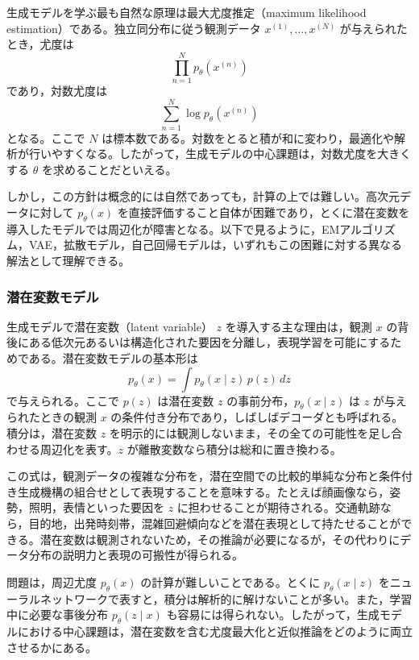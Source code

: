 生成モデルを学ぶ最も自然な原理は最大尤度推定（maximum likelihood estimation）である。独立同分布に従う観測データ \(x^{(1)},\dots,x^{(N)}\) が与えられたとき，尤度は
\begin{equation}
\prod_{n=1}^{N} p_{\theta}(x^{(n)})
\end{equation}
であり，対数尤度は
\begin{equation}
\sum_{n=1}^{N} \log p_{\theta}(x^{(n)})
\end{equation}
となる。ここで \(N\) は標本数である。対数をとると積が和に変わり，最適化や解析が行いやすくなる。したがって，生成モデルの中心課題は，対数尤度を大きくする \(\theta\) を求めることだといえる。

しかし，この方針は概念的には自然であっても，計算の上では難しい。高次元データに対して \(p_{\theta}(x)\) を直接評価すること自体が困難であり，とくに潜在変数を導入したモデルでは周辺化が障害となる。以下で見るように，EMアルゴリズム，VAE，拡散モデル，自己回帰モデルは，いずれもこの困難に対する異なる解法として理解できる。

\subsubsection{潜在変数モデル}

生成モデルで潜在変数（latent variable） \(z\) を導入する主な理由は，観測 \(x\) の背後にある低次元あるいは構造化された要因を分離し，表現学習を可能にするためである。潜在変数モデルの基本形は
\begin{equation}
p_{\theta}(x) = \int p_{\theta}(x \mid z)\, p(z)\, dz
\end{equation}
で与えられる。ここで \(p(z)\) は潜在変数 \(z\) の事前分布，\(p_{\theta}(x \mid z)\) は \(z\) が与えられたときの観測 \(x\) の条件付き分布であり，しばしばデコーダとも呼ばれる。積分は，潜在変数 \(z\) を明示的には観測しないまま，その全ての可能性を足し合わせる周辺化を表す。\(z\) が離散変数なら積分は総和に置き換わる。

この式は，観測データの複雑な分布を，潜在空間での比較的単純な分布と条件付き生成機構の組合せとして表現することを意味する。たとえば顔画像なら，姿勢，照明，表情といった要因を \(z\) に担わせることが期待される。交通軌跡なら，目的地，出発時刻帯，混雑回避傾向などを潜在表現として持たせることができる。潜在変数は観測されないため，その推論が必要になるが，その代わりにデータ分布の説明力と表現の可搬性が得られる。

問題は，周辺尤度 \(p_{\theta}(x)\) の計算が難しいことである。とくに \(p_{\theta}(x \mid z)\) をニューラルネットワークで表すと，積分は解析的に解けないことが多い。また，学習中に必要な事後分布 \(p_{\theta}(z \mid x)\) も容易には得られない。したがって，生成モデルにおける中心課題は，潜在変数を含む尤度最大化と近似推論をどのように両立させるかにある。

